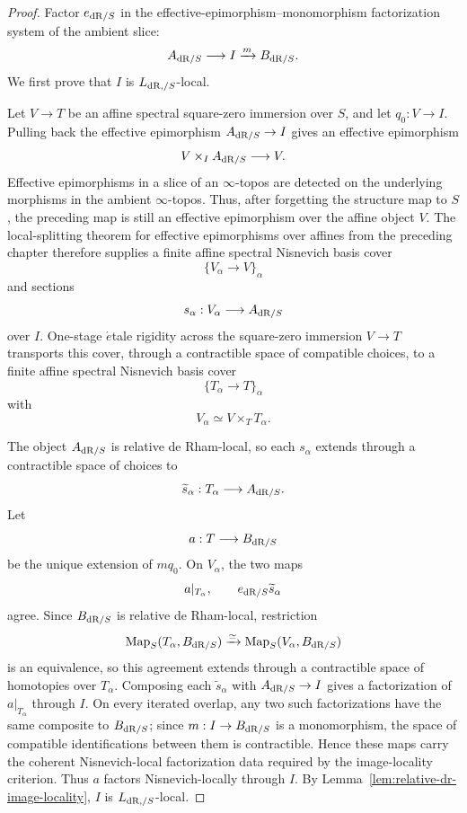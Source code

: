 \begin{proof}
Factor \(e_{\mathrm{dR}/S}\) in the effective-epimorphism--monomorphism factorization system of the
ambient slice:
\[
    A_{\mathrm{dR}/S}
    \longrightarrow
    I
    \xrightarrow{m}
    B_{\mathrm{dR}/S}.
\]
We first prove that \(I\) is \(L_{\mathrm{dR},/S}\)-local.

Let \(V\to T\) be an affine spectral square-zero immersion over \(S\), and let
\(q_0:V\to I\).  Pulling back the effective epimorphism \(A_{\mathrm{dR}/S}\to I\) gives an effective
epimorphism
\[
    V\times_I A_{\mathrm{dR}/S}\longrightarrow V.
\]
Effective epimorphisms in a slice of an \(\infty\)-topos are detected on the underlying morphisms in
the ambient \(\infty\)-topos.  Thus, after forgetting the structure map to \(S\), the preceding map
is still an effective epimorphism over the affine object \(V\).  The local-splitting theorem for
effective epimorphisms over affines from the preceding chapter therefore supplies a finite affine
spectral Nisnevich basis cover
\[
    \{V_\alpha\longrightarrow V\}_\alpha
\]
and sections
\[
    s_\alpha:V_\alpha\longrightarrow A_{\mathrm{dR}/S}
\]
over \(I\).  One-stage \(\acute{e}\)tale rigidity across the square-zero immersion \(V\to T\)
transports this cover, through a contractible space of compatible choices, to a finite affine
spectral Nisnevich basis cover
\[
    \{T_\alpha\longrightarrow T\}_\alpha
\]
with
\[
    V_\alpha\simeq V\times_TT_\alpha.
\]

The object \(A_{\mathrm{dR}/S}\) is relative de Rham-local, so each \(s_\alpha\) extends through a
contractible space of choices to
\[
    \widetilde s_\alpha:T_\alpha\longrightarrow A_{\mathrm{dR}/S}.
\]
Let
\[
    a:T\longrightarrow B_{\mathrm{dR}/S}
\]
be the unique extension of \(mq_0\).  On \(V_\alpha\), the two maps
\[
    a|_{T_\alpha},
    \qquad
    e_{\mathrm{dR}/S}\widetilde s_\alpha
\]
agree.  Since \(B_{\mathrm{dR}/S}\) is relative de Rham-local, restriction
\[
    \operatorname{Map}_S(T_\alpha,B_{\mathrm{dR}/S})
    \xrightarrow{\simeq}
    \operatorname{Map}_S(V_\alpha,B_{\mathrm{dR}/S})
\]
is an equivalence, so this agreement extends through a contractible space of homotopies over
\(T_\alpha\).  Composing each \(\widetilde s_\alpha\) with
\(A_{\mathrm{dR}/S}\to I\) gives a factorization of \(a|_{T_\alpha}\) through \(I\).
On every iterated overlap, any two such factorizations have the same composite to
\(B_{\mathrm{dR}/S}\); since \(m:I\to B_{\mathrm{dR}/S}\) is a monomorphism, the space of compatible
identifications between them is contractible.  Hence these maps carry the coherent Nisnevich-local
factorization data required by the image-locality criterion.  Thus \(a\) factors
Nisnevich-locally through \(I\).  By
Lemma~\ref{lem:relative-dr-image-locality}, \(I\) is \(L_{\mathrm{dR},/S}\)-local.


\end{proof}
